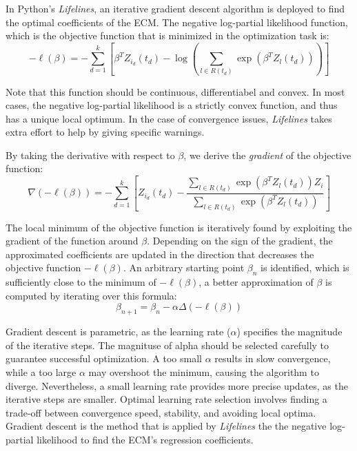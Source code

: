 In Python's \textit{Lifelines}, an iterative gradient descent algorithm is deployed to find the optimal coefficients of the ECM. The negative log-partial likelihood function, which is the objective function that is minimized in the optimization task is: 
$$-\ell(\beta) = - \sum_{d=1}^{k} \left[ \beta^T Z_{i_d}(t_d) - \log\left(\sum_{l \in R(t_d)} \exp(\beta^T Z_{l}(t_d))\right) \right]$$ %

Note that this function should be continuous, differentiabel and convex. In most cases, the negative log-partial likelihood is a strictly convex function, and thus has a unique local optimum. In the case of convergence issues, \textit{Lifelines} takes extra effort to help by giving specific warnings. 

By taking the derivative with respect to $\beta$, we derive the \textit{gradient} of the objective function:
$$ \nabla (-\ell(\beta)) = - \sum_{d=1}^{k} \left[Z_{i_d}(t_d) - \frac{\sum_{l \in R(t_d)} \exp(\beta^T Z_{l}(t_d))Z_{i}}{\sum_{l \in R(t_d)} \exp(\beta^T Z_{l}(t_d))} \right]$$

The local minimum of the objective function is iteratively found by exploiting the gradient of the function around $\beta$. Depending on the sign of the gradient, the approximated coefficients are updated in the direction that decreases the objective function $-\ell(\beta)$. An arbitrary starting point $\beta_n$ is identified, which is sufficiently close to the minimum of $-\ell(\beta)$, a better approximation of $\beta$ is computed by iterating over this formula: 
$$\beta_{n+1} = \beta_n - \alpha \Delta (-\ell(\beta))$$

Gradient descent is parametric, as the learning rate ($\alpha$) specifies the magnitude of the iterative steps. The magnituse of alpha should be selected carefully to guarantee successful optimization. A too small $\alpha$ results in slow convergence, while a too large $\alpha$ may overshoot the minimum, causing the algorithm to diverge. Nevertheless, a small learning rate provides more precise updates, as the iterative steps are smaller. Optimal learning rate selection involves finding a trade-off between convergence speed, stability, and avoiding local optima.
Gradient descent is the method that is applied by \textit{Lifelines} the the negative log-partial likelihood to find the ECM's regression coefficients. %


